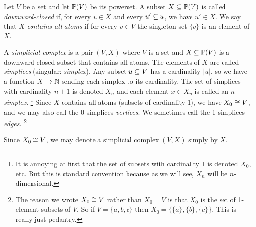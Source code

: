 \documentclass[CT4S-EN-RU]{subfiles}
\begin{document}

\subsubsection{}\label{sec:simplicial complex}

\begin{definitionENG}\label{def:simplicial complex}
Let $V$ be a set and let $\PP(V)$ be its powerset. A subset $X\ss\PP(V)$ is called {\em downward-closed} if, for every $u\in X$ and every $u'\ss u$, we have $u'\in X$. We say that $X$ {\em contains all atoms} if for every $v\in V$ the singleton set $\{v\}$ is an element of $X$. 

A {\em simplicial complex} is a pair $(V,X)$ where $V$ is a set and $X\ss\PP(V)$ is a downward-closed subset that contains all atoms. The elements of $X$ are called {\em simplices} (singular: {\em simplex}). Any subset $u\ss V$ has a cardinality $|u|$, so we have a function $X\to\NN$ sending each simplex to its cardinality. The set of simplices with cardinality $n+1$ is denoted $X_n$ and each element $x\in X_n$ is called an {\em $n$-simplex}.%
\footnote{It is annoying at first that the set of subsets with cardinality 1 is denoted $X_0$, etc. But this is standard convention because as we will see, $X_n$ will be $n$-dimensional.}
Since $X$ contains all atoms (subsets of cardinality 1), we have $X_0\iso V$, and we may also call the 0-simplices {\em vertices}. We sometimes call the 1-simplices {\em edges}.%
\footnote{The reason we wrote $X_0\iso V$ rather than $X_0=V$ is that $X_0$ is the set of 1-element subsets of $V$. So if $V=\{a,b,c\}$ then $X_0=\{\{a\},\{b\},\{c\}\}$. This is really just pedantry.}

Since $X_0\iso V$, we may denote a simplicial complex $(V,X)$ simply by $X$.
\end{definitionENG}
\end{document}
